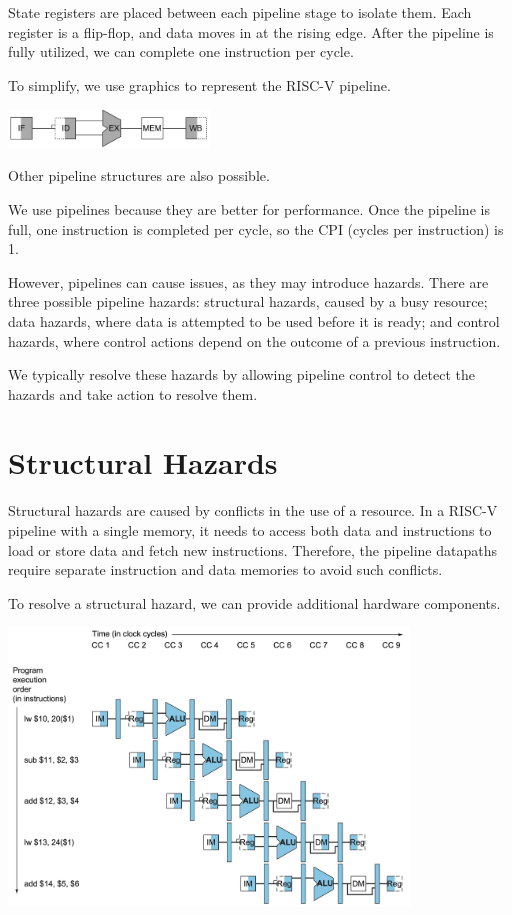 State registers are placed between each pipeline stage to isolate them. Each register is a flip-flop, and data moves in at the rising edge. After the pipeline is fully utilized, we can complete one instruction per cycle.

To simplify, we use graphics to represent the RISC-V pipeline.
\begin{center}
  \includegraphics[width=0.4\textwidth]{Figure/Pipeline_graphic.png}
\end{center}

Other pipeline structures are also possible.

We use pipelines because they are better for performance. Once the pipeline is full, one instruction is completed per cycle, so the CPI (cycles per instruction) is 1.

However, pipelines can cause issues, as they may introduce hazards. There are three possible pipeline hazards: structural hazards, caused by a busy resource; data hazards, where data is attempted to be used before it is ready; and control hazards, where control actions depend on the outcome of a previous instruction.

We typically resolve these hazards by allowing pipeline control to detect the hazards and take action to resolve them.

\section{Structural Hazards}
Structural hazards are caused by conflicts in the use of a resource. In a RISC-V pipeline with a single memory, it needs to access both data and instructions to load or store data and fetch new instructions. Therefore, the pipeline datapaths require separate instruction and data memories to avoid such conflicts. 

To resolve a structural hazard, we can provide additional hardware components.

\begin{center}
  \includegraphics[width=0.8\textwidth]{Figure/structuralHazard.png}
\end{center}

